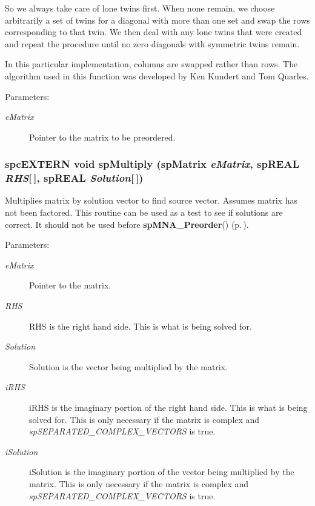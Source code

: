 So we always take care of lone twins first. When none remain, we choose arbitrarily a set of twins for a diagonal with more than one set and swap the rows corresponding to that twin. We then deal with any lone twins that were created and repeat the procedure until no zero diagonals with symmetric twins remain.

In this particular implementation, columns are swapped rather than rows. The algorithm used in this function was developed by Ken Kundert and Tom Quarles.\begin{Desc}
\item[Parameters: ]\par
\begin{description}
\item[{\em 
e\-Matrix}]Pointer to the matrix to be preordered. \end{description}
\end{Desc}
\subsubsection{\setlength{\rightskip}{0pt plus 5cm}spc\-EXTERN void sp\-Multiply ({\bf sp\-Matrix} {\em e\-Matrix}, sp\-REAL {\em RHS}[$\,$], sp\-REAL {\em Solution}[$\,$])}\label{spMatrix_8h_a58}


Multiplies matrix by solution vector to find source vector. Assumes matrix has not been factored. This routine can be used as a test to see if solutions are correct. It should not be used before {\bf sp\-MNA\_\-Preorder}() {\rm (p.\,\pageref{spMatrix_8h_a44})}.\begin{Desc}
\item[Parameters: ]\par
\begin{description}
\item[{\em 
e\-Matrix}]Pointer to the matrix. \item[{\em 
RHS}]RHS is the right hand side. This is what is being solved for. \item[{\em 
Solution}]Solution is the vector being multiplied by the matrix. \item[{\em 
i\-RHS}]i\-RHS is the imaginary portion of the right hand side. This is what is being solved for. This is only necessary if the matrix is complex and {\em sp\-SEPARATED\_\-COMPLEX\_\-VECTORS} is true. \item[{\em 
i\-Solution}]i\-Solution is the imaginary portion of the vector being multiplied by the matrix. This is only necessary if the matrix is complex and {\em sp\-SEPARATED\_\-COMPLEX\_\-VECTORS} is true. \end{description}
\end{Desc}
